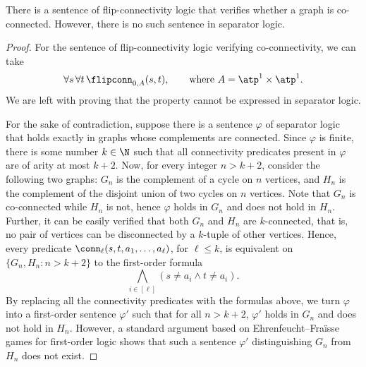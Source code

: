 \begin{proposition}
 There is a sentence of flip-connectivity logic that verifies whether a graph is co-connected. However, there is no such sentence in separator logic.
\end{proposition}
\begin{proof}
 For the sentence of flip-connectivity logic verifying co-connectivity, we can take \[\forall s\,\forall t\, \flipconn_{0,A}(s,t),\qquad\textrm{where }A=\atp^1\times \atp^1.\]
 We are left with proving that the property cannot be expressed in separator logic.

 For the sake of contradiction, suppose there is a sentence $\varphi$ of separator logic that holds exactly in graphs whose complements are connected. Since $\varphi$ is finite, there is some number $k\in \N$ such that all connectivity predicates present in $\varphi$ are of arity at most $k+2$. Now, for every integer $n>k+2$, consider the following two graphs: $G_n$ is the complement of a cycle on $n$ vertices, and $H_n$ is the complement of the disjoint union of two cycles on $n$ vertices. Note that $G_n$ is co-connected while $H_n$ is not, hence $\varphi$ holds in $G_n$ and does not hold in $H_n$. Further, it can be easily verified that both $G_n$ and $H_n$ are $k$-connected, that is, no pair of vertices can be disconnected by a $k$-tuple of other vertices. Hence, every predicate $\conn_\ell(s,t,a_1,\ldots,a_\ell)$, for $\ell\leq k$, is equivalent on $\{G_n,H_n\colon n>k+2\}$ to the first-order formula
 \[\bigwedge_{i\in [\ell]} (s\neq a_i \wedge t\neq a_i).\]
 By replacing all the connectivity predicates with the formulas above, we turn $\varphi$ into a first-order sentence $\varphi'$ such that for all $n>k+2$, $\varphi'$ holds in $G_n$ and does not hold in $H_n$. However, a standard argument based on Ehrenfeucht--Fra\"isse games for first-order logic shows that such a sentence $\varphi'$ distinguishing $G_n$ from $H_n$ does not exist.
\end{proof}
